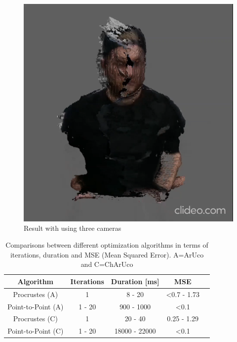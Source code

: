 \documentclass[10pt,twocolumn,letterpaper]{article}
\begin{document}
\begin{figure}[t]
\begin{center}
\includegraphics[width=0.65\linewidth]{imgs/res3}
\end{center}
 \caption{Result with using three cameras}
 \label{fig:res3}
\end{figure}

\begin{table}[h!]
  \begin{center}
    \begin{tabular}{c|c|c|c p{4cm}}
      \textbf{Algorithm} & \textbf{Iterations} & \textbf{Duration [ms]} & \textbf{MSE}\\
      \hline
      Procrustes (A)  & 1 & 8 - 20 & \textless 0.7 - 1.73\\
      Point-to-Point (A) & 1 - 20 & 900 - 1000 & \textless 0.1\\
      Procrustes (C) & 1 & 20 - 40 & 0.25 - 1.29\\
      Point-to-Point (C) & 1 - 20 & 18000 - 22000 & \textless 0.1\\
    \end{tabular}
     \caption{Comparisons between different optimization algorithms in terms of iterations, duration and MSE (Mean Squared Error). A=ArUco and C=ChArUco}
     \label{tab:table1}
  \end{center}
\end{table}
\end{document}
